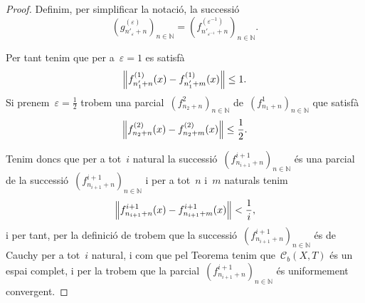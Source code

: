 \documentclass[../../main.tex]{subfiles}
\begin{document}
\begin{lemma}
\begin{proof}
			Definim, per simplificar la notació, la successió
			\[
			    \left(g^{(\varepsilon)}_{n'_{\varepsilon}+n}\right)_{n\in\mathbb{N}}=\left(f^{(\varepsilon^{-1})}_{n'_{\varepsilon^{-1}}+n}\right)_{n\in\mathbb{N}}.
			\]

			Per tant tenim que per a~\(\varepsilon=1\) es satisfà
			\[
			    \norm{f^{(1)}_{n'_{1}+n}(x)-f^{(1)}_{n'_{1}+m}(x)}\leq1.
			\]
			Si prenem~\(\varepsilon=\frac{1}{2}\) trobem una parcial~\((f^{2}_{n_{2}+n})_{n\in\mathbb{N}}\) de~\((f^{1}_{n_{1}+n})_{n\in\mathbb{N}}\) que satisfà
			\[
			    \norm{f^{(2)}_{n_{2}+n}(x)-f^{(2)}_{n_{2}+m}(x)}\leq\frac{1}{2}.
			\]

			Tenim doncs que per a tot~\(i\) natural la successió~\((f^{i+1}_{n_{i+1}+n})_{n\in\mathbb{N}}\) és una parcial de la successió~\((f^{i+1}_{n_{i+1}+n})_{n\in\mathbb{N}}\) i per a tot~\(n\) i~\(m\) naturals tenim
			\[
			    \norm{f^{i+1}_{n_{i+1}+n}(x)-f^{i+1}_{n_{i+1}+m}(x)}<\frac{1}{i},
			\]
			i per tant, per la definició de  trobem que la successió~\((f^{i+1}_{n_{i+1}+n})_{n\in\mathbb{N}}\) és de Cauchy per a tot~\(i\) natural, i com que pel Teorema  tenim que~\(\mathcal{C}_{b}(X,T)\) és un espai complet, i per la  trobem que la parcial~\((f^{i+1}_{n_{i+1}+n})_{n\in\mathbb{N}}\) és uniformement convergent.
		\end{proof}
	\end{lemma}
\end{document}
